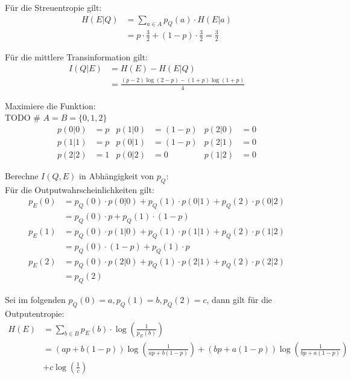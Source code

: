 \begin{myList}
Für die Streuentropie gilt:
\begin{align*}
	H(E|Q) &= \sum\limits_{a \in A} p_Q(a) \cdot H(E|a) \\
	&= p \cdot \frac{3}{2} + (1-p) \cdot \frac{3}{2} = \frac{3}{2}
\end{align*}

Für die mittlere Transinformation gilt:
\begin{align*}
	I(Q|E) &= H(E) - H(E|Q)\\
	&= \frac{(p-2)\log(2-p) - (1+p)\log(1+p)}{4}
\end{align*}



Maximiere die Funktion:\\
TODO
#
$A = B = \lbrace 0,1,2 \rbrace$
\begin{align*}
	p(0|0) &= p & p(1|0) &= (1-p) & p(2|0) &= 0 \\
	p(1|1) &= p & p(0|1) &= (1-p) & p(2|1) &= 0 \\
	p(2|2) &= 1 & p(0|2) &= 0 & p(1|2) &= 0
\end{align*}

Berechne $I(Q,E)$ in Abhängigkeit von $p_Q$:\\
Für die Outputwahrscheinlichkeiten gilt:
\begin{align*}
	p_E(0) &= p_Q(0) \cdot p(0|0) + p_Q(1) \cdot p(0|1) + p_Q(2) \cdot p(0|2) \\
	&= p_Q(0) \cdot p + p_Q(1) \cdot (1-p) \\
	p_E(1) &= p_Q(0) \cdot p(1|0) + p_Q(1) \cdot p(1|1) + p_Q(2) \cdot p(1|2)\\
	&= p_Q(0) \cdot (1-p) + p_Q(1) \cdot p \\
	p_E(2) &= p_Q(0) \cdot p(2|0) + p_Q(1) \cdot p(2|1) + p_Q(2) \cdot p(2|2)\\
	&= p_Q(2)
\end{align*}

Sei im folgenden $p_Q(0) = a, p_Q(1) = b, p_Q(2) = c$, dann gilt für die Outputentropie:
\begin{align*}
	H(E) &= \sum\limits_{b \in B} p_E(b) \cdot \log \left( \frac{1}{p_E(b)} \right)\\
	&= (ap + b(1-p))\log \left(\frac{1}{ap + b(1-p)}\right) + (bp + a(1-p))\log \left(\frac{1}{bp + a(1-p)}\right)\\
	&+ c \log\left( \frac{1}{c} \right)
\end{align*}


\end{myList}
